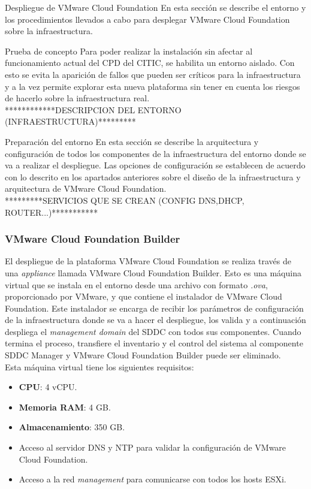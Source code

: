 \begin{section}{Despliegue de VMware Cloud Foundation}
En esta sección se describe el entorno y los procedimientos llevados a cabo para desplegar VMware Cloud Foundation sobre la infraestructura.
\begin{subsection}{Prueba de concepto}
Para poder realizar la instalación sin afectar al funcionamiento actual del CPD del CITIC, se habilita un entorno aislado. Con esto se evita la aparición de fallos que pueden ser críticos para la infraestructura y a la vez permite explorar esta nueva plataforma sin tener en cuenta los riesgos de hacerlo sobre la infraestructura real.\\
 ************DESCRIPCION DEL ENTORNO (INFRAESTRUCTURA)*********\\
\end{subsection}
\begin{subsection}{Preparación del entorno}
En esta sección se describe la arquitectura y configuración de todos los componentes de la infraestructura del entorno donde se va a realizar el despliegue. Las opciones de configuración se establecen de acuerdo con lo descrito en los apartados anteriores sobre el diseño de la infraestructura y arquitectura de VMware Cloud Foundation.
\\


*********SERVICIOS QUE SE CREAN (CONFIG DNS,DHCP, ROUTER...)***********\\

\subsubsection{VMware Cloud Foundation Builder}
El despliegue de la plataforma VMware Cloud Foundation se realiza través de una \textit{appliance} llamada VMware Cloud Foundation Builder. Esto es una máquina virtual que se instala en el entorno desde una archivo con formato \textit{.ova}, proporcionado por VMware, y que contiene el instalador de VMware Cloud Foundation. Este instalador se encarga de recibir los parámetros de configuración de la infraestructura donde se va a hacer el despliegue, los valida y a continuación despliega el \textit{management domain} del SDDC con todos sus componentes. Cuando termina el proceso, transfiere el inventario y el control del sistema al componente SDDC Manager y VMware Cloud Foundation Builder puede ser eliminado.\\
Esta máquina virtual tiene los siguientes requisitos:
\begin{itemize}
    \item \textbf{CPU}: 4 vCPU.
    \item \textbf{Memoria RAM}: 4 GB.
    \item \textbf{Almacenamiento}: 350 GB.
    \item Acceso al servidor DNS y NTP para validar la configuración de VMware Cloud Foundation.
    \item Acceso a la red \textit{management} para comunicarse con todos los hosts ESXi.
\end{itemize}



\end{subsection}
\end{section}
